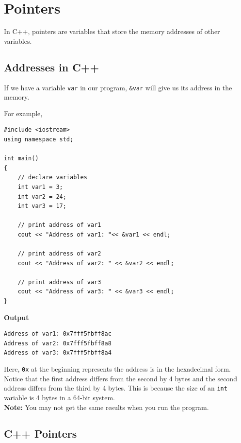 \newpage
\section{Pointers}
\label{sec:pointers}

In C++, pointers are variables that store the memory addresses of other variables.

\hypertarget{address}{%
\subsection{Addresses in C++}\label{address}}

If we have a variable \texttt{var} in our program, \texttt{\&var} will give us its address in the memory.\\
\vspace{.5cm}

For example,

\begin{verbatim}
#include <iostream>
using namespace std;

int main()
{
    // declare variables
    int var1 = 3;
    int var2 = 24;
    int var3 = 17;

    // print address of var1
    cout << "Address of var1: "<< &var1 << endl;

    // print address of var2
    cout << "Address of var2: " << &var2 << endl;

    // print address of var3
    cout << "Address of var3: " << &var3 << endl;
}
\end{verbatim}

\textbf{Output}

\begin{verbatim}
Address of var1: 0x7fff5fbff8ac
Address of var2: 0x7fff5fbff8a8
Address of var3: 0x7fff5fbff8a4
\end{verbatim}

Here, \texttt{0x} at the beginning represents the address is in the hexadecimal form. Notice that the first address differs from the second by 4 bytes and the second address differs from the third by 4 bytes. This is because the size of an \texttt{int} variable is 4 bytes in a 64-bit system.\\

\textbf{Note:} You may not get the same results when you run the program.


\doublelinewithspace{.0cm}

\hypertarget{pointer-variable}{%
\subsection{C++ Pointers}\label{pointer-variable}}

